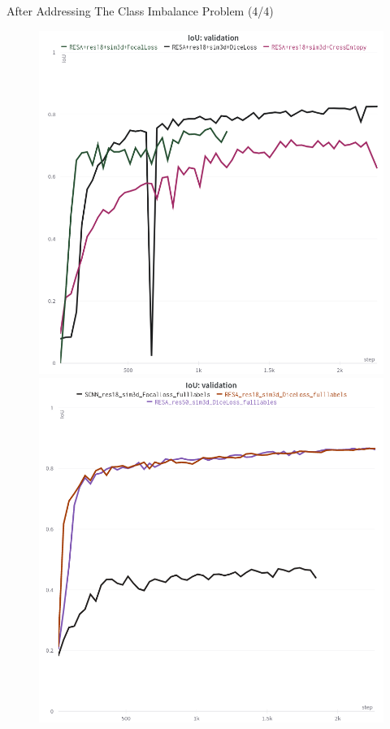 \documentclass[aspectratio=169]{beamer}
\begin{document}
\begin{frame}{After Addressing The Class Imbalance Problem (4/4)}
\begin{figure}
   \includegraphics[scale=0.2]{images/change2.png}
   \hfill
   \includegraphics[scale=0.2]{images/change1.png}
\end{figure}

\end{frame}
\end{document}
